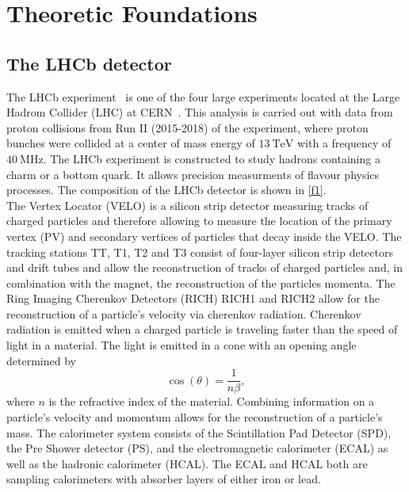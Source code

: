 \section{Theoretic Foundations}
\label{sec:Theorie}

\subsection{The LHCb detector}

The LHCb experiment~\cite{Collaboration_2008} is one of the four large experiments located at the Large Hadrom Collider (LHC) at CERN~\cite{Evans_2008}.
This analysis is carried out with data from proton collisions from Run II (2015-2018) of the experiment, where proton bunches were collided at
a center of mass energy of $\SI{13}{\tera\eV}$ with a frequency of $\SI{40}{\mega\hertz}$. The LHCb experiment is constructed to study hadrons
containing a charm or a bottom quark. It allows precision measurments of flavour physics processes.
The composition of the LHCb detector is shown in \autoref{f1}. \\
The Vertex Locator (VELO) is a silicon strip detector measuring tracks of charged particles and therefore allowing to measure the location of the
primary vertex (PV) and secondary vertices of particles that decay inside the VELO. The tracking stations TT, T1, T2 and T3 consist of four-layer silicon
strip detectors and drift tubes and allow the reconstruction of tracks of charged particles and, in combination with the magnet, the reconstruction of the
particles momenta.
The Ring Imaging Cherenkov Detectors (RICH) RICH1 and RICH2 allow for the reconstruction of a particle's velocity via cherenkov radiation.
Cherenkov radiation is emitted when a charged particle is traveling faster than the speed of light in a material. The light is emitted in a cone with an opening angle determined by
\begin{equation*}
  \cos (\theta) = \frac{1}{n \beta},
\end{equation*}
where $n$ is the refractive index of the material.
Combining information on a particle's velocity and momentum allows for the reconstruction of a particle's mass.
The calorimeter system consists of the Scintillation Pad Detector (SPD), the Pre Shower detector (PS), and the electromagnetic calorimeter (ECAL)
as well as the hadronic calorimeter (HCAL). The ECAL and HCAL both are sampling calorimeters with absorber layers of either iron or lead.
